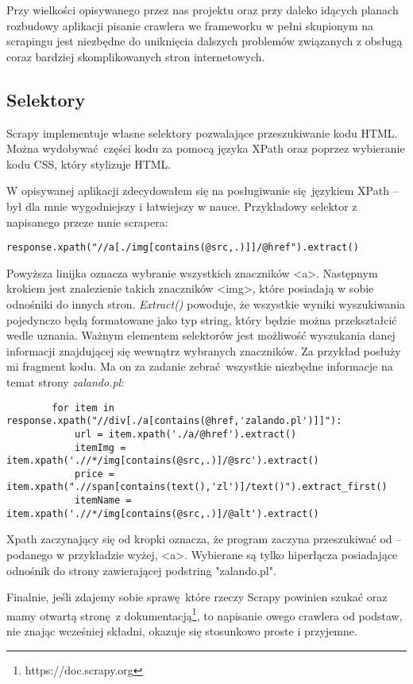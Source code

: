 Przy wielkości opisywanego przez nas projektu oraz przy daleko idących planach rozbudowy aplikacji pisanie crawlera we frameworku w pełni skupionym na scrapingu jest niezbędne do uniknięcia dalszych problemów związanych z obsługą coraz bardziej skomplikowanych stron internetowych.
\subsection{Selektory}

Scrapy implementuje własne selektory pozwalające przeszukiwanie kodu HTML.
Można wydobywać części kodu za pomocą języka XPath oraz poprzez wybieranie kodu CSS, który stylizuje HTML.

W opisywanej aplikacji zdecydowałem się na posługiwanie się językiem XPath -- był dla mnie wygodniejszy i łatwiejszy w nauce.
Przykładowy selektor z napisanego przeze mnie scrapera:
\begin{lstlisting}
response.xpath("//a[./img[contains(@src,.)]]/@href").extract()
\end{lstlisting}
Powyższa linijka oznacza wybranie wszystkich znaczników \textless a\textgreater. Następnym krokiem jest znalezienie takich znaczników \textless img\textgreater, które posiadają w sobie odnośniki do innych stron. 
\emph{Extract()} powoduje, że wszystkie wyniki wyszukiwania pojedynczo będą formatowane jako typ string, który będzie można przekształcić wedle uznania.
Ważnym elementem selektorów jest możliwość wyszukania danej informacji znajdującej się wewnątrz wybranych znaczników.
Za przykład posłuży mi fragment kodu. Ma on za zadanie zebrać wszystkie niezbędne informacje na temat strony \emph{zalando.pl}:
\begin{lstlisting}
        for item in response.xpath("//div[./a[contains(@href,'zalando.pl')]]"):
            url = item.xpath('./a/@href').extract()
            itemImg = item.xpath('.//*/img[contains(@src,.)]/@src').extract()
            price = item.xpath(".//span[contains(text(),'zl')]/text()").extract_first()
            itemName = item.xpath('.//*/img[contains(@src,.)]/@alt').extract()
\end{lstlisting}

Xpath zaczynający się od kropki oznacza, że program zaczyna przeszukiwać od -- podanego w przykładzie wyżej, \textless a\textgreater. Wybierane są tylko hiperłącza posiadające odnośnik do strony zawierającej podstring "zalando.pl".

Finalnie, jeśli zdajemy sobie sprawę które rzeczy Scrapy powinien szukać oraz mamy otwartą stronę z dokumentacją\footnote{https://doc.scrapy.org}, to napisanie owego crawlera od podstaw, nie znając wcześniej składni, okazuje się stosunkowo proste i przyjemne.
